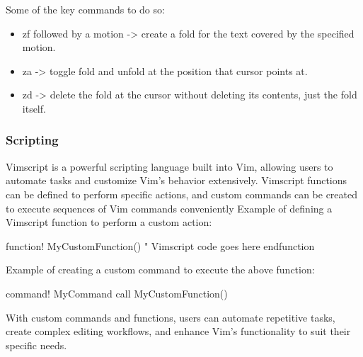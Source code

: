 \documentclass{article}
\begin{document}
	Some of the key commands to do so:
	\begin{itemize}
		\item zf followed by a motion -> create a fold for the text covered by the specified motion.
		\item za -> toggle fold and unfold at the position that cursor points at.
		\item zd -> delete the fold at the cursor without deleting its contents, just the fold itself.
	\end{itemize}

	\subsubsection{Scripting}
	Vimscript is a powerful scripting language built into Vim, allowing users to automate tasks and customize Vim's behavior extensively.
	Vimscript functions can be defined to perform specific actions, and custom commands can be created to execute sequences of Vim commands conveniently
	Example of defining a Vimscript function to perform a custom action:

	\begin{lslisting}
	function! MyCustomFunction()
    	" Vimscript code goes here
		endfunction
	\end{lslisting}

	Example of creating a custom command to execute the above function:

	\begin{lslisting}
	command! MyCommand call MyCustomFunction()
	\end{lslisting}


	With custom commands and functions, users can automate repetitive tasks, create complex editing workflows, and enhance Vim's functionality to suit their specific needs.
\end{document}
